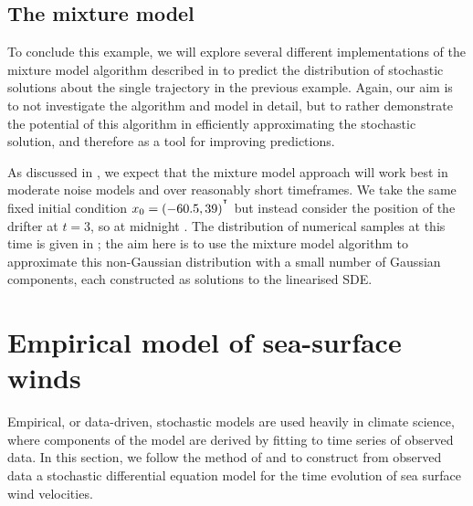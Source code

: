 \subsection{The mixture model}
To conclude this example, we will explore several different implementations of the mixture model algorithm described in  to predict the distribution of stochastic solutions about the single trajectory in the previous example.
Again, our aim is to not investigate the algorithm and model in detail, but to rather demonstrate the potential of this algorithm in efficiently approximating the stochastic solution, and therefore as a tool for improving predictions.

As discussed in , we expect that the mixture model approach will work best in moderate noise models and over reasonably short timeframes.
We take the same fixed initial condition \(x_0 = \left(-60.5, 39\right)^{^{\intercal}}\) but instead consider the position of the drifter at \(t = 3\), so at midnight .
The distribution of numerical samples at this time is given in ; the aim here is to use the mixture model algorithm to approximate this non-Gaussian distribution with a small number of Gaussian components, each constructed as solutions to the linearised SDE.









\section{Empirical model of sea-surface winds}

Empirical, or data-driven, stochastic models are used heavily in climate science, where components of the model are derived by fitting to time series of observed data.
In this section, we follow the method of \citet{EggerJonsson_2002_DynamicModelsIcelandic} and \citet{Sura_2003_StochasticAnalysisSouthern} to construct from observed data a stochastic differential equation model for the time evolution of sea surface wind velocities.

